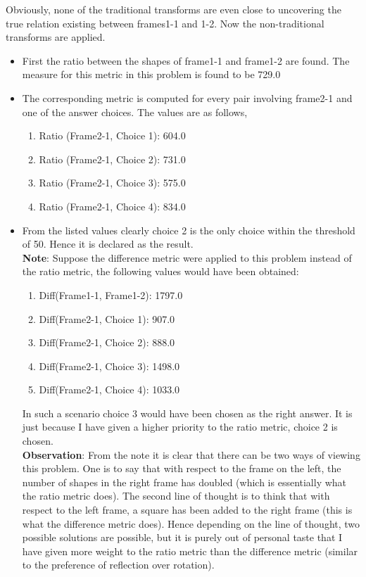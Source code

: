 \documentclass[10pt, letter]{article}
\begin{document}
Obviously, none of the traditional transforms are even close to uncovering the true relation existing between frames1-1 and 1-2. Now the non-traditional transforms are applied.
\begin{itemize}
\item First the ratio between the shapes of frame1-1 and frame1-2 are found. The measure for this metric in this problem is found to be 729.0
\item The corresponding metric is computed for every pair involving frame2-1 and one of the answer choices. The values are as follows,
	\begin{enumerate}
		\item Ratio (Frame2-1, Choice 1): 604.0
		\item Ratio (Frame2-1, Choice 2): 731.0
		\item Ratio (Frame2-1, Choice 3): 575.0
		\item Ratio (Frame2-1, Choice 4): 834.0
	\end{enumerate}
\item From the listed values clearly choice 2 is the only choice within the threshold of 50. Hence it is declared as the result.\\
\textbf{Note}: Suppose the difference metric were applied to this problem instead of the ratio metric, the following values would have been obtained:
	\begin{enumerate}
		\item Diff(Frame1-1, Frame1-2): 1797.0
		\item Diff(Frame2-1, Choice 1): 907.0
		\item Diff(Frame2-1, Choice 2): 888.0
		\item Diff(Frame2-1, Choice 3): 1498.0
		\item Diff(Frame2-1, Choice 4): 1033.0
	\end{enumerate}
In such a scenario choice 3 would have been chosen as the right answer. It is just because I have given a higher priority to the ratio metric, choice 2 is chosen.\\
\textbf{Observation}: From the note it is clear that there can be two ways of viewing this problem. One is to say that with respect to the frame on the left, the number of shapes in the right frame has doubled (which is essentially what the ratio metric does). The second line of thought is to think that with respect to the left frame, a square has been added to the right frame (this is what the difference metric does). Hence depending on the line of thought, two possible solutions are possible, but it is purely out of personal taste that I have given more weight to the ratio metric than the difference metric (similar to the preference of reflection over rotation).
\end{itemize}
\end{document}
